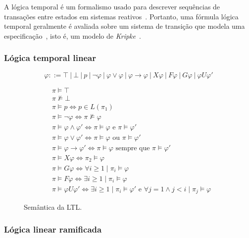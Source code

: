 A lógica temporal é um formalismo usado para descrever sequências de transações entre estados em sistemas reativos~\cite{clarke1999model}. Portanto, uma fórmula lógica temporal geralmente é avaliada sobre um sistema de transição que modela uma especificação~\cite{clarke1999model}, isto é, um modelo de \textit{Kripke}~\cite{kripke1959completeness}. 

\subsubsection{Lógica temporal linear}

\begin{equation}
\varphi ::= \top~|~\bot~|~p~|~\neg \varphi~|~\varphi \vee \varphi~|~\varphi \rightarrow \varphi~|~X\varphi~|~F\varphi~|~G\varphi~|~\varphi U \varphi'
\end{equation}

\begin{figure}[ht]
	\centering
	\begin{align}
	&\pi \models \top \\
	&\pi \nvDash \bot \\
	&\pi \models p \Longleftrightarrow p \in L(\pi_{1}) \\
	&\pi \models \neg \varphi \iff \pi \not \models \varphi \\
	&\pi \models \varphi \wedge \varphi' \iff \pi \models \varphi \mbox{ e } \pi \models \varphi' \\
	&\pi \models \varphi \vee \varphi' \iff \pi \models \varphi \mbox{ ou } \pi \models \varphi' \\
	&\pi \models \varphi \to \varphi' \iff \pi \models \varphi \mbox{ sempre que } \pi \models \varphi' \\
	&\pi \models X\varphi \iff \pi_2 \models \varphi \\
	&\pi \models G\varphi \iff \forall i \geq 1 \mid \pi_i \models \varphi \\
	&\pi \models F\varphi \iff \exists i \geq 1 \mid \pi_i \models \varphi \\
	&\pi \models \varphi U \varphi' \iff \exists i \geq 1 \mid \pi_i \models \varphi' \mbox{ e } \forall j = 1 \wedge j < i \mid \pi_j \models \varphi
	\end{align}
	\caption{Semântica da LTL.
		\label{fig:ltl_sem}}
\end{figure}
\FloatBarrier

\subsubsection{Lógica linear ramificada}

